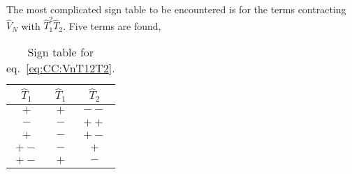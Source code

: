 The most complicated sign table to be encountered is for the terms contracting $\hat{V}_N$ with $\hat{T}_1^2 \hat{T}_2$. Five terms are found,
\begin{table}
\caption{Sign table for eq.~\eqref{eq:CC:VnT12T2}.}
\label{tab:CC:SignVnT12T2}
\begin{center}
\begin{tabular}{c|c|c}
$\hat{T}_1$ & $\hat{T}_1$ & $\hat{T}_2$ \\
\hline 
$+$  & $+$  & $--$ \\
$-$  & $-$  & $++$ \\
$+$  & $-$  & $+-$ \\
$+-$ & $-$  & $+$  \\
$+-$ & $+$  & $-$
\end{tabular}
\end{center}
\end{table}

